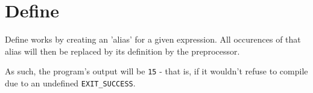 \documentclass[a4paper]{scrartcl}
\begin{document}
\section{Define}

Define works by creating an 'alias' for a given expression. All occurences of
that alias will then be replaced by its definition by the preprocessor.

As such, the program's output will be \texttt{15} - that is, if it wouldn't
refuse to compile due to an undefined \texttt{EXIT\_SUCCESS}.
\end{document}

